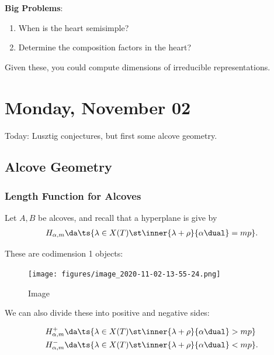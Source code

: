 \textbf{Big Problems}:

\begin{enumerate}
\def\labelenumi{\arabic{enumi}.}
\item
  When is the heart semisimple?
\item
  Determine the composition factors in the heart?
\end{enumerate}

Given these, you could compute dimensions of irreducible
representations.

\hypertarget{monday-november-02}{%
\section{Monday, November 02}\label{monday-november-02}}

Today: Lusztig conjectures, but first some alcove geometry.

\hypertarget{alcove-geometry}{%
\subsection{Alcove Geometry}\label{alcove-geometry}}

\hypertarget{length-function-for-alcoves}{%
\subsubsection{Length Function for
Alcoves}\label{length-function-for-alcoves}}

Let \(A, B\) be alcoves, and recall that a hyperplane is give by
\begin{align*}  
H_{\alpha, m} \da \ts{ \lambda \in X(T) \st \inner{\lambda + \rho}{\alpha\dual} = mp }
.\end{align*}

These are codimension 1 objects:

\begin{figure}
\centering
\texttt{[image: figures/image\_2020-11-02-13-55-24.png]}
\caption{Image}
\end{figure}

We can also divide these into positive and negative sides:

\begin{align*}  
H_{\alpha, m}^+ &\da \ts{   \lambda \in X(T) \st \inner{\lambda + \rho}{\alpha\dual} > mp } \\
H_{\alpha, m}^- &\da \ts{   \lambda \in X(T) \st \inner{\lambda + \rho}{\alpha\dual} < mp } 
.\end{align*}

